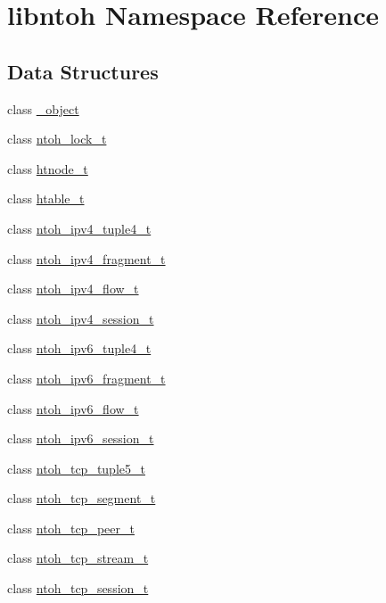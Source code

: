 \hypertarget{namespacelibntoh}{\section{libntoh Namespace Reference}
\label{namespacelibntoh}
}
\subsection*{Data Structures}
\begin{DoxyCompactItemize}
\item 
class \hyperlink{classlibntoh_1_1__object}{\-\_\-object}
\item 
class \hyperlink{classlibntoh_1_1ntoh__lock__t}{ntoh\-\_\-lock\-\_\-t}
\item 
class \hyperlink{classlibntoh_1_1htnode__t}{htnode\-\_\-t}
\item 
class \hyperlink{classlibntoh_1_1htable__t}{htable\-\_\-t}
\item 
class \hyperlink{classlibntoh_1_1ntoh__ipv4__tuple4__t}{ntoh\-\_\-ipv4\-\_\-tuple4\-\_\-t}
\item 
class \hyperlink{classlibntoh_1_1ntoh__ipv4__fragment__t}{ntoh\-\_\-ipv4\-\_\-fragment\-\_\-t}
\item 
class \hyperlink{classlibntoh_1_1ntoh__ipv4__flow__t}{ntoh\-\_\-ipv4\-\_\-flow\-\_\-t}
\item 
class \hyperlink{classlibntoh_1_1ntoh__ipv4__session__t}{ntoh\-\_\-ipv4\-\_\-session\-\_\-t}
\item 
class \hyperlink{classlibntoh_1_1ntoh__ipv6__tuple4__t}{ntoh\-\_\-ipv6\-\_\-tuple4\-\_\-t}
\item 
class \hyperlink{classlibntoh_1_1ntoh__ipv6__fragment__t}{ntoh\-\_\-ipv6\-\_\-fragment\-\_\-t}
\item 
class \hyperlink{classlibntoh_1_1ntoh__ipv6__flow__t}{ntoh\-\_\-ipv6\-\_\-flow\-\_\-t}
\item 
class \hyperlink{classlibntoh_1_1ntoh__ipv6__session__t}{ntoh\-\_\-ipv6\-\_\-session\-\_\-t}
\item 
class \hyperlink{classlibntoh_1_1ntoh__tcp__tuple5__t}{ntoh\-\_\-tcp\-\_\-tuple5\-\_\-t}
\item 
class \hyperlink{classlibntoh_1_1ntoh__tcp__segment__t}{ntoh\-\_\-tcp\-\_\-segment\-\_\-t}
\item 
class \hyperlink{classlibntoh_1_1ntoh__tcp__peer__t}{ntoh\-\_\-tcp\-\_\-peer\-\_\-t}
\item 
class \hyperlink{classlibntoh_1_1ntoh__tcp__stream__t}{ntoh\-\_\-tcp\-\_\-stream\-\_\-t}
\item 
class \hyperlink{classlibntoh_1_1ntoh__tcp__session__t}{ntoh\-\_\-tcp\-\_\-session\-\_\-t}
\end{DoxyCompactItemize}
